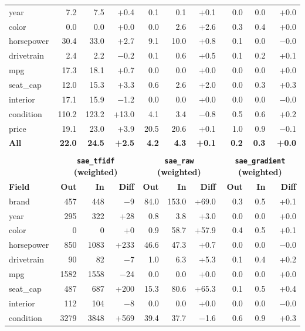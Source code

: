 \documentclass{article} %
\begin{document}
\begin{table}[h]
\begin{tabular}{@{}l rrr | rrr | rrr@{}}
year & 7.2 & 7.5 & +0.4 & 0.1 & 0.1 & +0.1 & 0.0 & 0.0 & +0.0 \\
color & 0.0 & 0.0 & +0.0 & 0.0 & 2.6 & +2.6 & 0.3 & 0.4 & +0.0 \\
horsepower & 30.4 & 33.0 & +2.7 & 9.1 & 10.0 & +0.8 & 0.1 & 0.0 & $-$0.0 \\
drivetrain & 2.4 & 2.2 & $-$0.2 & 0.1 & 0.6 & +0.5 & 0.1 & 0.2 & +0.1 \\
mpg & 17.3 & 18.1 & +0.7 & 0.0 & 0.0 & +0.0 & 0.0 & 0.0 & +0.0 \\
seat\_cap & 12.0 & 15.3 & +3.3 & 0.6 & 2.6 & +2.0 & 0.0 & 0.3 & +0.3 \\
interior & 17.1 & 15.9 & $-$1.2 & 0.0 & 0.0 & +0.0 & 0.0 & 0.0 & $-$0.0 \\
condition & 110.2 & 123.2 & +13.0 & 4.1 & 3.4 & $-$0.8 & 0.5 & 0.6 & +0.2 \\
price & 19.1 & 23.0 & +3.9 & 20.5 & 20.6 & +0.1 & 1.0 & 0.9 & $-$0.1 \\
\midrule
\textbf{All} & \textbf{22.0} & \textbf{24.5} & \textbf{+2.5} & \textbf{4.2} & \textbf{4.3} & \textbf{+0.1} & \textbf{0.2} & \textbf{0.3} & \textbf{+0.0} \\
\bottomrule
\\[-6pt]
\toprule
 & \multicolumn{3}{c|}{\textbf{\texttt{sae\_tfidf} (weighted)}} & \multicolumn{3}{c|}{\textbf{\texttt{sae\_raw} (weighted)}} & \multicolumn{3}{c}{\textbf{\texttt{sae\_gradient} (weighted)}} \\
\textbf{Field} & \textbf{Out} & \textbf{In} & \textbf{Diff} & \textbf{Out} & \textbf{In} & \textbf{Diff} & \textbf{Out} & \textbf{In} & \textbf{Diff} \\
\midrule
brand & 457 & 448 & $-$9 & 84.0 & 153.0 & +69.0 & 0.3 & 0.5 & +0.1 \\
year & 295 & 322 & +28 & 0.8 & 3.8 & +3.0 & 0.0 & 0.0 & +0.0 \\
color & 0 & 0 & +0 & 0.9 & 58.7 & +57.9 & 0.4 & 0.5 & +0.1 \\
horsepower & 850 & 1083 & +233 & 46.6 & 47.3 & +0.7 & 0.0 & 0.0 & $-$0.0 \\
drivetrain & 90 & 82 & $-$7 & 1.0 & 6.3 & +5.3 & 0.1 & 0.4 & +0.2 \\
mpg & 1582 & 1558 & $-$24 & 0.0 & 0.0 & +0.0 & 0.0 & 0.0 & +0.0 \\
seat\_cap & 487 & 687 & +200 & 15.3 & 80.6 & +65.3 & 0.1 & 0.5 & +0.4 \\
interior & 112 & 104 & $-$8 & 0.0 & 0.0 & +0.0 & 0.0 & 0.0 & $-$0.0 \\
condition & 3279 & 3848 & +569 & 39.4 & 37.7 & $-$1.6 & 0.6 & 0.9 & +0.3 \\

\end{tabular}
\end{table}
\end{document}
